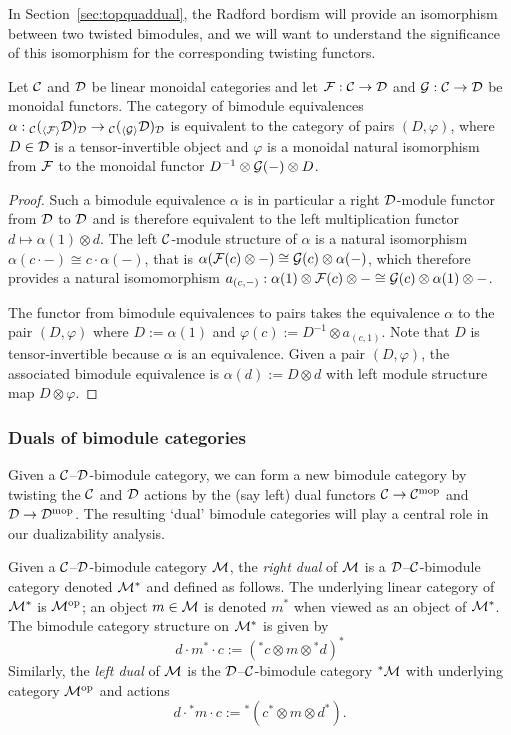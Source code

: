\documentclass{amsart}
\begin{document}
In Section~\ref{sec:topquaddual}, the Radford bordism will provide an isomorphism between two twisted bimodules, and we will want to understand the significance of this isomorphism for the corresponding twisting functors.

\begin{lemma} \label{lem:BimoduleToFunctor}
Let $\mathcal C$ and $\mathcal D$ be linear monoidal categories and let $\mathcal F: \mathcal C \rightarrow \mathcal D$ and $\mathcal G: \mathcal C \rightarrow \mathcal D$ be monoidal functors.  The category of bimodule equivalences $\alpha: {}_\mathcal C ({}_{\langle \mathcal F \rangle} \mathcal D)_\mathcal D \rightarrow {}_\mathcal C ({}_{\langle \mathcal G \rangle} \mathcal D)_\mathcal D$ is equivalent to the category of pairs $(D, \varphi)$, where $D \in \mathcal D$ is a tensor-invertible object and $\varphi$ is a monoidal natural isomorphism from $\mathcal F$ to the monoidal functor $D^{-1} \otimes \mathcal G(-) \otimes D$.
\end{lemma}
\begin{proof}
Such a bimodule equivalence $\alpha$ is in particular a right $\mathcal D$-module functor from $\mathcal D$ to $\mathcal D$ and is therefore equivalent to the left multiplication functor $d \mapsto \alpha(1) \otimes d$.  The left $\mathcal C$-module structure of $\alpha$ is a natural isomorphism $\alpha(c \cdot -) \cong c \cdot \alpha(-)$, that is $\alpha(\mathcal F(c) \otimes -) \cong \mathcal G(c) \otimes \alpha(-)$, which therefore provides a natural isomomorphism $a_{(c,-)}: \alpha(1) \otimes \mathcal F(c) \otimes - \cong \mathcal G(c) \otimes \alpha(1) \otimes -$.

The functor from bimodule equivalences to pairs takes the equivalence $\alpha$ to the pair $(D,\varphi)$ where $D:=\alpha(1)$ and $\varphi(c) := D^{-1} \otimes a_{(c,1)}$.  Note that $D$ is tensor-invertible because $\alpha$ is an equivalence.  Given a pair $(D,\varphi)$, the associated bimodule equivalence is $\alpha(d) := D \otimes d$ with left module structure map $D \otimes \varphi$.
\end{proof}


\subsubsection{Duals of bimodule categories}

Given a $\mathcal C$--$\mathcal D$-bimodule category, we can form a new bimodule category by twisting the $\mathcal C$ and $\mathcal D$ actions by the (say left) dual functors $\mathcal C \rightarrow \mathcal C^{\mathrm{mop}}$ and $\mathcal D \rightarrow \mathcal D^{\mathrm{mop}}$.  The resulting `dual' bimodule categories will play a central role in our dualizability analysis.

\begin{definition} \label{def:Dual_bimodule_notation}
Given a $\mathcal C$--$\mathcal D$-bimodule category $\mathcal M$, the \emph{right dual} of $\mathcal M$ is a $\mathcal D$--$\mathcal C$-bimodule category denoted $\mathcal M^*$ and defined as follows.  The underlying linear category of $\mathcal M^*$ is $\mathcal M^{\mathrm{op}}$; an object $m \in \mathcal M$ is denoted $m^*$ when viewed as an object of $\mathcal M^*$.  The bimodule category structure on $\mathcal M^*$ is given by
\[
d \cdot m^* \cdot c := ({}^* c \otimes m \otimes {}^* d)^*
\]
Similarly, the \emph{left dual} of $\mathcal M$ is the $\mathcal D$--$\mathcal C$-bimodule category ${}^* \mathcal M$ with underlying category $\mathcal M^{\mathrm{op}}$ and actions
\[
d \cdot {}^* m \cdot c := {}^* (c^* \otimes m \otimes d^*).
\]
\end{definition}
\end{document}
